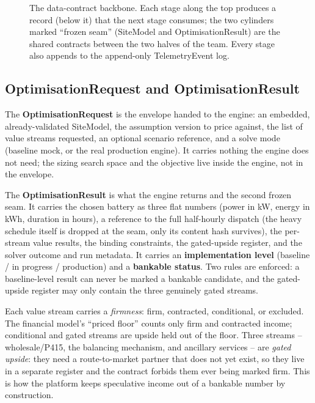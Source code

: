 \begin{figure}[H]
{}
\caption{The data-contract backbone. Each stage along the top produces a record (below it) that the next stage consumes; the two cylinders marked ``frozen seam'' (SiteModel and OptimisationResult) are the shared contracts between the two halves of the team. Every stage also appends to the append-only TelemetryEvent log.}
\label{fig:backbone}
\end{figure}

\subsection{OptimisationRequest and OptimisationResult}

The \textbf{OptimisationRequest} is the envelope handed to the engine: an embedded, already-validated SiteModel, the assumption version to price against, the list of value streams requested, an optional scenario reference, and a solve mode (baseline mock, or the real production engine). It carries nothing the engine does not need; the sizing search space and the objective live inside the engine, not in the envelope.

The \textbf{OptimisationResult} is what the engine returns and the second frozen seam. It carries the chosen battery as three flat numbers (power in kW, energy in kWh, duration in hours), a reference to the full half-hourly dispatch (the heavy schedule itself is dropped at the seam, only its content hash survives), the per-stream value results, the binding constraints, the gated-upside register, and the solver outcome and run metadata. It carries an \textbf{implementation level} (baseline / in progress / production) and a \textbf{bankable status}. Two rules are enforced: a baseline-level result can never be marked a bankable candidate, and the gated-upside register may only contain the three genuinely gated streams.

\begin{keyidea}
Each value stream carries a \emph{firmness}: firm, contracted, conditional, or excluded. The financial model's ``priced floor'' counts only firm and contracted income; conditional and gated streams are upside held out of the floor. Three streams -- wholesale/P415, the balancing mechanism, and ancillary services -- are \emph{gated upside}: they need a route-to-market partner that does not yet exist, so they live in a separate register and the contract forbids them ever being marked firm. This is how the platform keeps speculative income out of a bankable number by construction.
\end{keyidea}

